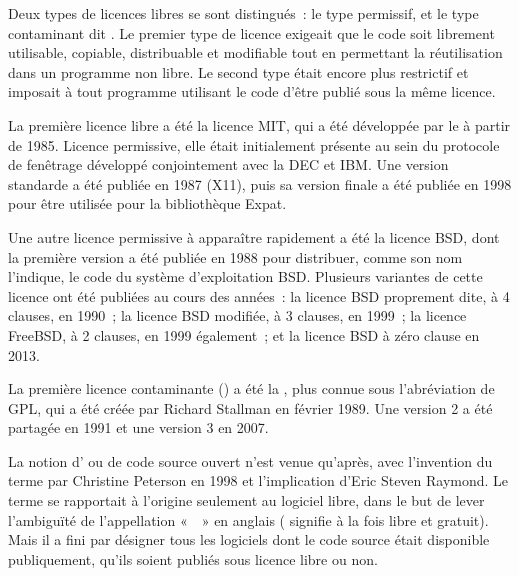 Deux types de licences libres se sont distingués~: le type permissif, et le type contaminant dit . Le premier type de licence exigeait que le code soit librement utilisable, copiable, distribuable et modifiable tout en permettant la réutilisation dans un programme non libre. Le second type était encore plus restrictif et imposait à tout programme utilisant le code d'être publié sous la même licence.

La première licence libre a été la licence MIT, qui a été développée par le  à partir de 1985. Licence permissive, elle était initialement présente au sein du protocole de fenêtrage  développé conjointement avec la DEC et IBM. Une version standarde a été publiée en 1987 (X11), puis sa version finale a été publiée en 1998 pour être utilisée pour la bibliothèque Expat.

Une autre licence permissive à apparaître rapidement a été la licence BSD, dont la première version a été publiée en 1988 pour distribuer, comme son nom l'indique, le code du système d'exploitation BSD. Plusieurs variantes de cette licence ont été publiées au cours des années~: la licence BSD proprement dite, à 4 clauses, en 1990~; la licence BSD modifiée, à 3 clauses, en 1999~; la licence FreeBSD, à 2 clauses, en 1999 également~; et la licence BSD à zéro clause en 2013.

La première licence contaminante () a été la , plus connue sous l'abréviation de GPL, qui a été créée par Richard Stallman en février 1989. Une version 2 a été partagée en 1991 et une version 3 en 2007.

La notion d' ou de code source ouvert n'est venue qu'après, avec l'invention du terme par Christine Peterson en 1998 et l'implication d'Eric Steven Raymond. Le terme se rapportait à l'origine seulement au logiciel libre, dans le but de lever l'ambiguïté de l'appellation «~~» en anglais ( signifie à la fois libre et gratuit). Mais il a fini par désigner tous les logiciels dont le code source était disponible publiquement, qu'ils soient publiés sous licence libre ou non.

